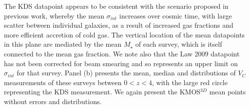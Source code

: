 \documentclass[fleqn,usenatbib]{mn2e}
\begin{document}
\begin{figure*}
{    The KDS datapoint appears to be consistent with the scenario proposed in previous work, whereby the mean $\sigma_{int}$ increases over cosmic time, with large scatter between individual galaxies, as a result of increased gas fractions and more efficient accretion of cold gas.
    The vertical location of the mean datapoints in this plane are mediated by the mean $M_{\star}$ of each survey, which is itself connected to the mean gas fraction. 
    We note also that the Law 2009 datapoint has not been corrected for beam smearing and so represents an upper limit on $\sigma_{int}$ for that survey. 
    Panel (b) presents the mean, median and distributions of $V_{C}$ measurements of these surveys between $0 < z < 4$, with the large red circle representing the KDS measurement.
    We again present the KMOS$^{3D}$ mean points without errors and distributions.} 
    \label{fig:sigma_and_v_sigma_w_redshift}
\end{figure*}
\end{document}
